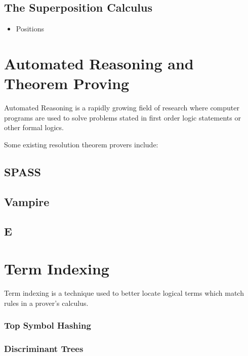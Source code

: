 \subsection{The Superposition Calculus}



\begin{itemize}
\item Positions
\end{itemize}

\section{Automated Reasoning and Theorem Proving}
\label{sec:proving}

Automated Reasoning is a rapidly growing field of research where computer programs
are used to solve problems stated in first order logic statements or other formal logics.

Some existing resolution theorem provers include:

\subsection{SPASS}
\cite{spass}

\subsection{Vampire}
\cite{vampire}

\subsection{E}
\cite{eprover}

\section{Term Indexing}
\label{sec:indexing}

Term indexing is a technique used to better locate logical terms which match rules
in a prover's calculus.

\subsubsection{Top Symbol Hashing}

\subsubsection{Discriminant Trees}


